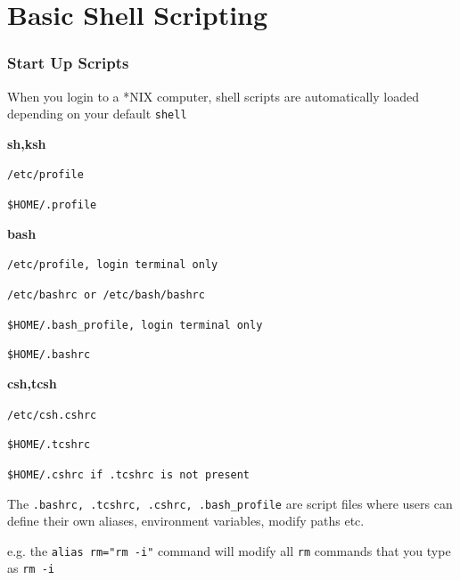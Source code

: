 \documentclass[slidestop,mathserif,compress,xcolor=svgnames]{beamer}
\begin{document}
\section{Basic Shell Scripting}
\begin{frame}
  \frametitle{\small Start Up Scripts}
  \begin{itemize}
    {\scriptsize
    \item When you login to a *NIX computer, shell scripts are automatically loaded depending on your default \texttt{shell}
    \item \textbf{sh,ksh}
    \begin{enumerate}
      {\scriptsize
        \item \texttt{/etc/profile}
        \item \texttt{\$HOME/.profile}
      }
    \end{enumerate}
    \item \textbf{bash}
    \begin{enumerate}
      {\scriptsize
        \item \texttt{/etc/profile, login terminal only}
        \item \texttt{/etc/bashrc or /etc/bash/bashrc}
        \item \texttt{\$HOME/.bash\_profile, login terminal only}
        \item \texttt{\$HOME/.bashrc}
      }
    \end{enumerate}
    \item \textbf{csh,tcsh}
    \begin{enumerate}
      {\scriptsize
        \item \texttt{/etc/csh.cshrc}
        \item \texttt{\$HOME/.tcshrc}
        \item \texttt{\$HOME/.cshrc if .tcshrc is not present}
      }
    \end{enumerate}
    \item The \texttt{.bashrc, .tcshrc, .cshrc, .bash\_profile} are script files where users can define their own aliases, environment variables, modify paths etc.
    \item e.g. the \texttt{alias rm="rm -i"} command will modify all \texttt{rm} commands that you type as \texttt{rm -i} 
    }
  \end{itemize}
\end{frame}
\end{document}
